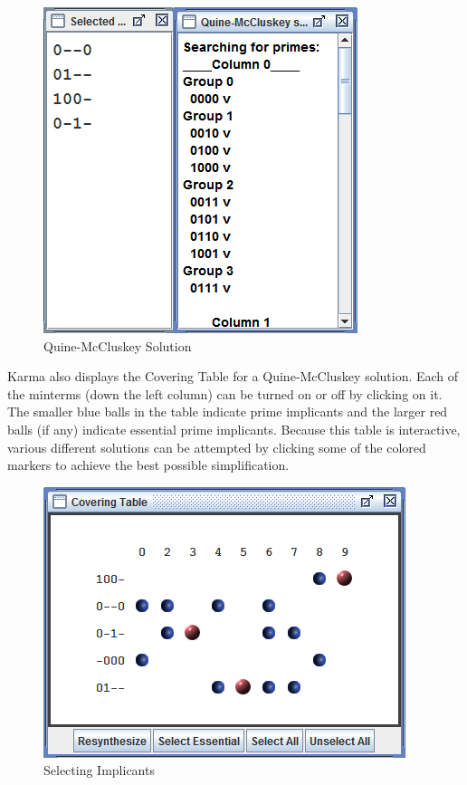 \begin{figure}[H]
	\centering
	\includegraphics[width=\maxwidth{.95\linewidth}]{gfx/07_07}
	\caption{Quine-McCluskey Solution}
	\label{fig:07_07}
\end{figure}

Karma also displays the Covering Table for a Quine‐McCluskey solution. Each of the minterms (down the left column) can be turned on or off by clicking on it. The smaller blue balls in the table indicate prime implicants and the larger red balls (if any) indicate essential prime implicants. Because this table is interactive, various different solutions can be attempted by clicking some of the colored markers to achieve the best possible simplification.

\begin{figure}[H]
	\centering
	\includegraphics[width=\maxwidth{.95\linewidth}]{gfx/07_08}
	\caption{Selecting Implicants}
	\label{fig:07_08}
\end{figure}

